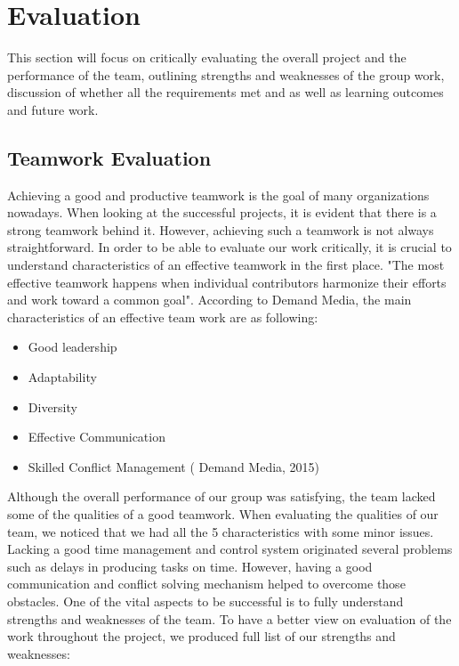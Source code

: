 \section{Evaluation}
This section will focus on critically evaluating the overall project and the performance of the team, outlining strengths and weaknesses of the group work, discussion of whether all the requirements met and as well as learning outcomes and future work. 

\subsection{Teamwork Evaluation}

Achieving a good and productive teamwork is the goal of many organizations nowadays. When looking at the successful projects, it is evident that there is a strong teamwork behind it. However, achieving such a teamwork is not always straightforward. In order to be able to evaluate our work critically, it is crucial to understand characteristics of an effective teamwork in the first place. "The most effective teamwork happens when individual contributors harmonize their efforts and work toward a common goal"\cite{wmtwe}. According to Demand Media, the main characteristics of an effective team work are as following:

\begin{itemize}
\item Good leadership
\item Adaptability
\item Diversity
\item Effective Communication
\item Skilled Conflict Management ( Demand Media, 2015)
\end{itemize} 

Although the overall performance of our group was satisfying, the team lacked some of the qualities of a good teamwork. When evaluating the qualities of our team, we noticed that we had all the 5 characteristics with some minor issues. Lacking a good time management and control system originated several problems such as delays in producing tasks on time. However, having a good communication and conflict solving mechanism helped to overcome those obstacles. One of the vital aspects to be successful is to fully understand strengths and weaknesses of the team.  To have a better view on evaluation of the work throughout the project, we produced full list of our strengths and weaknesses:\newline

